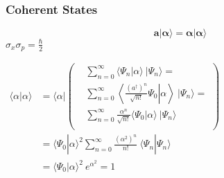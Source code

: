 \documentclass[12pt]{article}
\begin{document}
%
%
\newpage
\subsubsection{Coherent States}
\[ \boldsymbol{ a | \alpha \rangle = \alpha | \alpha \rangle } \]
\( \boxed{ \sigma_x \sigma_p = \frac{\hbar}{2} } \)\\[5pt]
\noindent
\begin{minipage}{.45\textwidth}
    \( \begin{aligned}
        \langle \alpha | \alpha \rangle 
            &= \langle \alpha | 
            \left( \begin{aligned}
                &\sum_{n=0}^\infty 
                    \langle \Psi_n | \alpha \rangle \ | \Psi_n \rangle =\\
                &\sum_{n=0}^\infty \left\langle \left. 
                    \frac{(a^\dagger)^n}{\sqrt{n!}} \Psi_0 \right| \alpha \right\rangle \ 
                    | \Psi_n \rangle = \\
                &\sum_{n=0}^\infty 
                    \frac{\alpha^n}{\sqrt{n!}} \langle \Psi_0 | \alpha \rangle
                    \ | \Psi_n \rangle\\
            \end{aligned} \right) \\[5pt]
        &= \langle \Psi_0 | \alpha \rangle^2 \sum_{n=0}^\infty
            \frac{ (\alpha^{2})^n}{n!} \ \langle \Psi_n|\Psi_n \rangle\\[5pt]
        &= \langle \Psi_0 | \alpha \rangle^2 \ e^{\alpha^{2}} = 1
    \end{aligned} \) 
\end{minipage}
\end{document}

